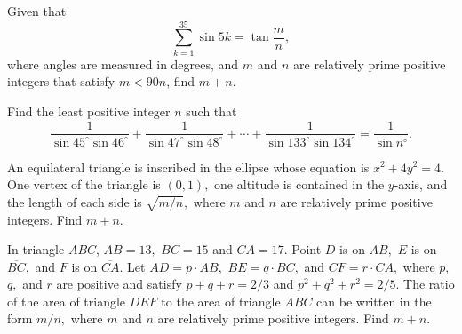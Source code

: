 %	




\begin{question}[name={1999 AIME, \href{https://artofproblemsolving.com/community/c4p392229}{Problem 11}}]
	Given that $$\sum_{k=1}^{35}\sin 5k=\tan \frac mn,$$ where angles are measured in degrees, and $m$ and $n$ are relatively prime positive integers that satisfy $ m<90n$, find $m+n$.
\end{question}


%	






\begin{question}[name={2000 AIME II, \href{https://artofproblemsolving.com/community/c4p385901}{Problem 15}}]
	Find the least positive integer $n$ such that\[ \frac 1{\sin 45^\circ\sin 46^\circ}+\frac 1{\sin 47^\circ\sin 48^\circ}+\cdots+\frac 1{\sin 133^\circ\sin 134^\circ}=\frac 1{\sin n^\circ}. \]
\end{question}


%	





\begin{question}[name={2001 AIME I, \href{https://artofproblemsolving.com/community/c4p384176}{Problem 5}}]
	An equilateral triangle is inscribed in the ellipse whose equation is $x^2+4y^2=4.$ One vertex of the triangle is $(0,1),$ one altitude is contained in the $y$-axis, and the length of each side is $\sqrt{ m/n},$ where $m$ and $n$ are relatively prime positive integers. Find $m+n.$
\end{question}








\begin{question}[name={2001 AIME I, \href{https://artofproblemsolving.com/community/c4p384191}{Problem 9}}]
	In triangle $ABC$, $AB=13,$ $BC=15$ and $CA=17.$ Point $D$ is on $\overline{AB},$ $E$ is on $\overline{BC},$ and $F$ is on $\overline{CA}.$ Let $AD=p\cdot AB,$ $BE=q\cdot BC,$ and $CF=r\cdot CA,$ where $p,$ $q,$ and $r$ are positive and satisfy $p+q+r=2/3$ and $p^2+q^2+r^2=2/5.$ The ratio of the area of triangle $DEF$ to the area of triangle $ABC$ can be written in the form $m/n,$ where $m$ and $n$ are relatively prime positive integers. Find $m+n.$
	
\end{question}


